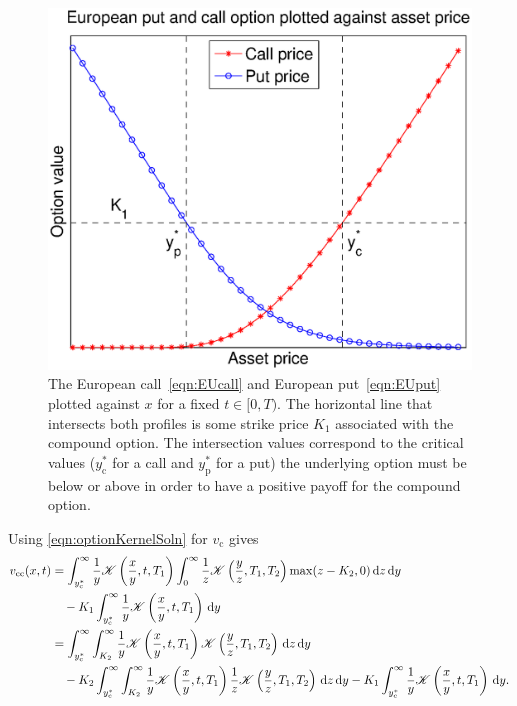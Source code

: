 \begin{figure}[!h]
	\includegraphics[scale=0.5]{figures/option.eps}
		\centering
		\caption{The European call~\eqref{eqn:EUcall} and European put~\eqref{eqn:EUput} plotted against $x$ for a fixed $t \in [0,T)$. The horizontal line that intersects both profiles is some strike price $K_1$ associated with the compound option. The intersection values correspond to the critical values ($y_\text{c}^*$ for a call and $y_\text{p}^*$ for a put) the underlying option must be below or above in order to have a positive payoff for the compound option.}
		\label{fig:1}
\end{figure}
\noindent
Using \eqref{eqn:optionKernelSoln} for $v_\text{c}$ gives
	\begin{align*}
		v_\text{cc}(x,t) &= \int_{y_\mathrm{c}^*}^\infty \frac{1}{y}\mathscr K\left( \frac{x}{y}, t, T_1 \right)\int_0^\infty \frac{1}{z} \mathscr K\left( \frac{y}{z}, T_1, T_2 \right)\max(z-K_2, 0) \, \mathrm d z \, \mathrm d y \\
		& \quad - K_1\int_{y_\mathrm{c}^*}^\infty \frac{1}{y}\mathscr K\left( \frac{x}{y}, t, T_1 \right) \, \mathrm d y \\
		&=  \int_{y_\mathrm{c}^*}^\infty \int_{K_2}^\infty \frac{1}{y}\mathscr K\left( \frac{x}{y}, t, T_1 \right)\mathscr K\left( \frac{y}{z}, T_1, T_2 \right) \, \mathrm d z \, \mathrm d y \\
		& \quad - K_2 \int_{y_\mathrm{c}^*}^\infty \int_{K_2}^\infty \frac{1}{y}\mathscr K\left( \frac{x}{y}, t, T_1 \right)\frac{1}{z}\mathscr K\left( \frac{y}{z}, T_1, T_2 \right) \, \mathrm d z \, \mathrm d y - K_1\int_{y_\mathrm{c}^*}^\infty \frac{1}{y}\mathscr K\left( \frac{x}{y}, t, T_1 \right) \, \mathrm d y.
	\end{align*}
